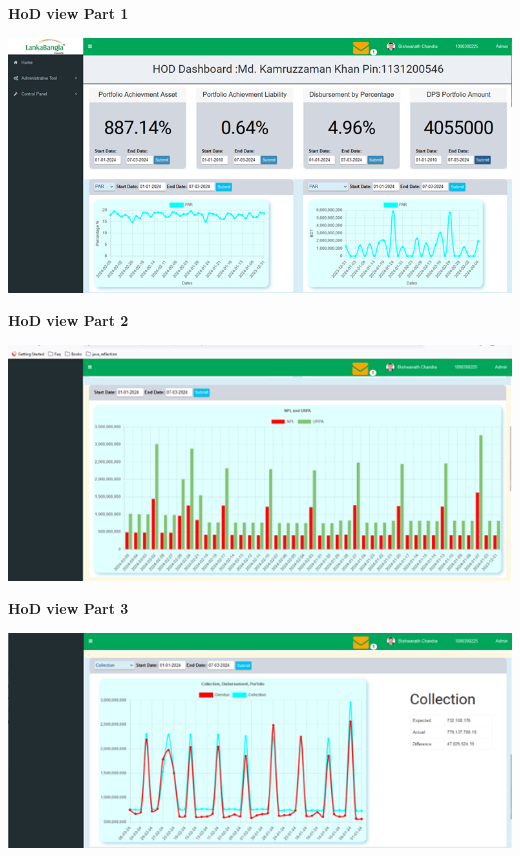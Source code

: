 \documentclass{article}
\begin{document}
\textbf{HoD view Part 1}\\
\begin{center}
\includegraphics[width=1.0\textwidth]{image/hod_1.png}
\end{center}
\vspace{\baselineskip}
\vspace{\baselineskip}

\textbf{HoD view Part 2}\\
\begin{center}
\includegraphics[width=1.0\textwidth]{image/hod_2.png}
\end{center}

\textbf{HoD view Part 3}\\
\begin{center}
\includegraphics[width=1.00\textwidth]{image/hod_3.png}
\end{center}
\end{document}
